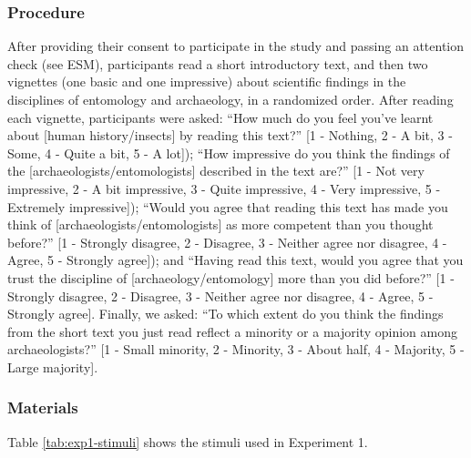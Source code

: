 \documentclass[
  english,
  doc,floatsintext]{apa6}
\begin{document}
\subsubsection{Procedure}\label{procedure}

After providing their consent to participate in the study and passing an attention check (see ESM), participants read a short introductory text, and then two vignettes (one basic and one impressive) about scientific findings in the disciplines of entomology and archaeology, in a randomized order. After reading each vignette, participants were asked: ``How much do you feel you've learnt about {[}human history/insects{]} by reading this text?'' {[}1 - Nothing, 2 - A bit, 3 - Some, 4 - Quite a bit, 5 - A lot{]}); ``How impressive do you think the findings of the {[}archaeologists/entomologists{]} described in the text are?'' {[}1 - Not very impressive, 2 - A bit impressive, 3 - Quite impressive, 4 - Very impressive, 5 - Extremely impressive{]}); ``Would you agree that reading this text has made you think of {[}archaeologists/entomologists{]} as more competent than you thought before?'' {[}1 - Strongly disagree, 2 - Disagree, 3 - Neither agree nor disagree, 4 - Agree, 5 - Strongly agree{]}); and ``Having read this text, would you agree that you trust the discipline of {[}archaeology/entomology{]} more than you did before?'' {[}1 - Strongly disagree, 2 - Disagree, 3 - Neither agree nor disagree, 4 - Agree, 5 - Strongly agree{]}. Finally, we asked: ``To which extent do you think the findings from the short text you just read reflect a minority or a majority opinion among archaeologists?'' {[}1 - Small minority, 2 - Minority, 3 - About half, 4 - Majority, 5 - Large majority{]}.

\subsubsection{Materials}\label{materials}

Table \ref{tab:exp1-stimuli} shows the stimuli used in Experiment 1.

\begingroup\fontsize{8}{10}\selectfont
\end{document}
